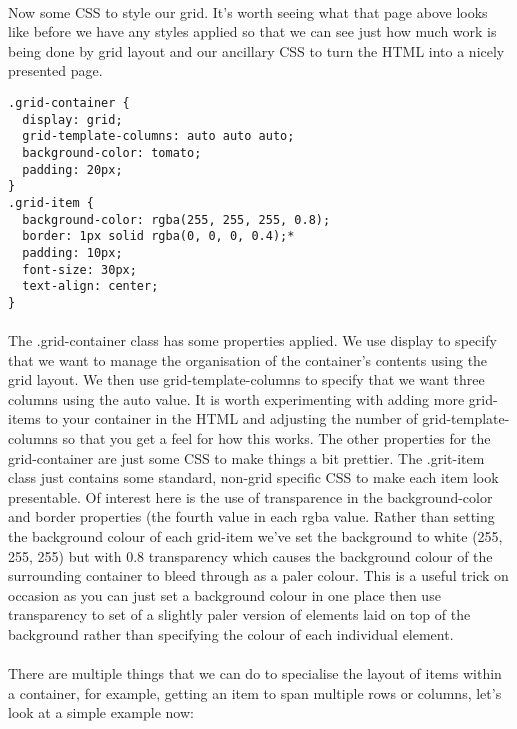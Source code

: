 \documentclass[10pt, a4paper, twosize]{article}
\begin{document}
\paragraph{} Now some CSS to style our grid. It's worth seeing what that page above looks like before we have any styles applied so that we can see just how much work is being done by grid layout and our ancillary CSS to turn the HTML into a nicely presented page.
\begin{lstlisting}
.grid-container {
  display: grid;
  grid-template-columns: auto auto auto;
  background-color: tomato;
  padding: 20px;
}
.grid-item {
  background-color: rgba(255, 255, 255, 0.8);
  border: 1px solid rgba(0, 0, 0, 0.4);*
  padding: 10px;
  font-size: 30px;
  text-align: center;
}
\end{lstlisting}
\paragraph{} The .grid-container class has some properties applied. We use display to specify that we want to manage the organisation of the container's contents using the grid layout. We then use grid-template-columns to specify that we want three columns using the auto value. It is worth experimenting with adding more grid-items to your container in the HTML and adjusting the number of grid-template-columns so that you get a feel for how this works. The other properties for the grid-container are just some CSS to make things a bit prettier. The .grit-item class just contains some standard, non-grid specific CSS to make each item look presentable. Of interest here is the use of transparence in the background-color and border properties (the fourth value in each rgba value. Rather than setting the background colour of each grid-item we've set the background to white (255, 255, 255) but with 0.8 transparency which causes the background colour of the surrounding container to bleed through as a paler colour. This is a useful trick on occasion as you can just set a background colour in one place then use transparency to set of a slightly paler version of elements laid on top of the background rather than specifying the colour of each individual element.

\paragraph{} There are multiple things that we can do to specialise the layout of items within a container, for example, getting an item to span multiple rows or columns, let's look at a simple example now:
\end{document}
